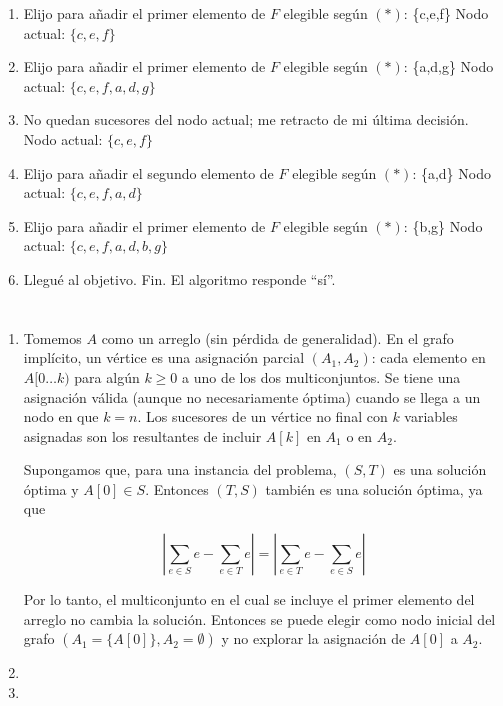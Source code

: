 \documentclass{article}
\begin{document}
\begin{enumerate}
\begin{enumerate}
\item Elijo para añadir el primer elemento de $F$ elegible según $(*)$: \{c,e,f\}
      Nodo actual: $\{c, e, f\}$

\item Elijo para añadir el primer elemento de $F$ elegible según $(*)$: \{a,d,g\}
      Nodo actual: $\{c,e,f,a,d,g\}$

\item No quedan sucesores del nodo actual; me retracto de mi última decisión.
      Nodo actual: $\{c, e, f\}$

\item Elijo para añadir el segundo elemento de $F$ elegible según $(*)$: \{a,d\}
      Nodo actual: $\{c, e, f, a, d\}$

\item Elijo para añadir el primer elemento de $F$ elegible según $(*)$: \{b,g\}
      Nodo actual: $\{c, e, f, a, d, b, g\}$

\item Llegué al objetivo. Fin. El algoritmo responde ``sí''.
\end{enumerate}

\end{enumerate}

\section{}

\begin{enumerate}

 \item

Tomemos $A$ como un arreglo (sin pérdida de generalidad). En el grafo implícito, un vértice es
una asignación parcial $(A_1, A_2)$: cada elemento en $A[0 \ldots k)$ para algún $k \geq 0$ a uno de los dos multiconjuntos.
Se tiene una asignación válida (aunque no necesariamente óptima) cuando se llega a un nodo en que $k = n$.
Los sucesores de un vértice no final con $k$ variables asignadas
son los resultantes de incluir $A[k]$ en $A_1$ o en $A_2$.

Supongamos que, para una instancia del problema, $(S, T)$ es una solución óptima
y $A[0] \in S$. Entonces $(T, S)$ también es una solución óptima, ya que

$$
\left|\sum_{e \in S} e - \sum_{e \in T} e\right| = \left|\sum_{e \in T} e - \sum_{e \in S} e\right|
$$

Por lo tanto, el multiconjunto en el cual se incluye el primer elemento del arreglo no cambia la solución.
Entonces se puede elegir como nodo inicial del grafo $(A_1 = \{A[0]\}, A_2 = \emptyset)$ y no explorar
la asignación de $A[0]$ a $A_2$.

 \item


 \item


\end{enumerate}

\section{}
\end{document}
